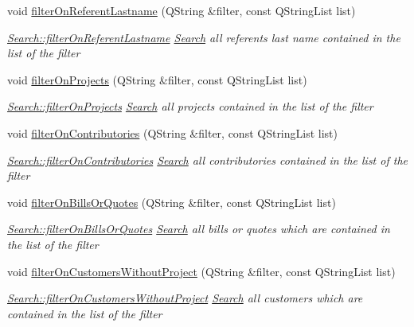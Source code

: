 \begin{DoxyCompactItemize}
void \hyperlink{classModels_1_1Search_a27536d8a999a32164e1ac90bf9d24906}{filter\+On\+Referent\+Lastname} (Q\+String \&filter, const Q\+String\+List list)
\begin{DoxyCompactList}\small\item\em \hyperlink{classModels_1_1Search_a27536d8a999a32164e1ac90bf9d24906}{Search\+::filter\+On\+Referent\+Lastname} \hyperlink{classModels_1_1Search}{Search} all referents last name contained in the {\itshape list} of the {\itshape filter} \end{DoxyCompactList}\item 
void \hyperlink{classModels_1_1Search_a4f5672fa4dc52e3ea7bda9b4c654147f}{filter\+On\+Projects} (Q\+String \&filter, const Q\+String\+List list)
\begin{DoxyCompactList}\small\item\em \hyperlink{classModels_1_1Search_a4f5672fa4dc52e3ea7bda9b4c654147f}{Search\+::filter\+On\+Projects} \hyperlink{classModels_1_1Search}{Search} all projects contained in the {\itshape list} of the {\itshape filter} \end{DoxyCompactList}\item 
void \hyperlink{classModels_1_1Search_acb948c15a52305c29cf4c5b9489e9f18}{filter\+On\+Contributories} (Q\+String \&filter, const Q\+String\+List list)
\begin{DoxyCompactList}\small\item\em \hyperlink{classModels_1_1Search_acb948c15a52305c29cf4c5b9489e9f18}{Search\+::filter\+On\+Contributories} \hyperlink{classModels_1_1Search}{Search} all contributories contained in the {\itshape list} of the {\itshape filter} \end{DoxyCompactList}\item 
void \hyperlink{classModels_1_1Search_ad80f840390720ad3239aa0fc87e483fc}{filter\+On\+Bills\+Or\+Quotes} (Q\+String \&filter, const Q\+String\+List list)
\begin{DoxyCompactList}\small\item\em \hyperlink{classModels_1_1Search_ad80f840390720ad3239aa0fc87e483fc}{Search\+::filter\+On\+Bills\+Or\+Quotes} \hyperlink{classModels_1_1Search}{Search} all bills or quotes which are contained in the {\itshape list} of the {\itshape filter} \end{DoxyCompactList}\item 
void \hyperlink{classModels_1_1Search_af92c03f00f81edeaf5a209d7b830be3a}{filter\+On\+Customers\+Without\+Project} (Q\+String \&filter, const Q\+String\+List list)
\begin{DoxyCompactList}\small\item\em \hyperlink{classModels_1_1Search_af92c03f00f81edeaf5a209d7b830be3a}{Search\+::filter\+On\+Customers\+Without\+Project} \hyperlink{classModels_1_1Search}{Search} all customers which are contained in the {\itshape list} of the {\itshape filter} \end{DoxyCompactList}\item 

\end{DoxyCompactItemize}
